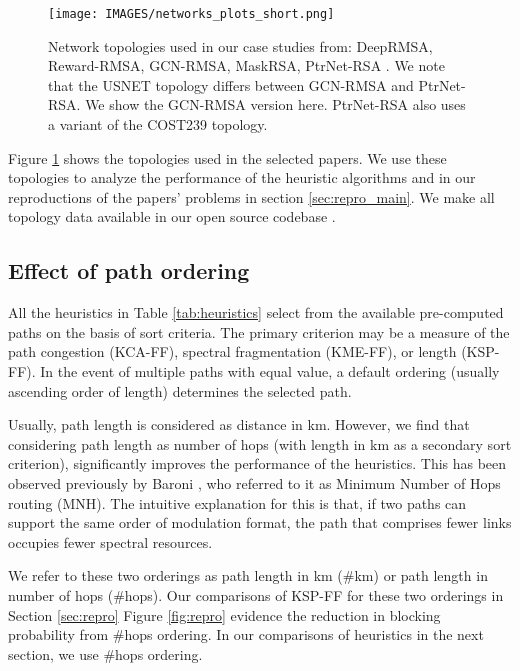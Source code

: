 \begin{figure}
  \texttt{[image: IMAGES/networks\_plots\_short.png]}
  \caption{Network topologies used in our case studies from: DeepRMSA, Reward-RMSA, GCN-RMSA, MaskRSA, PtrNet-RSA \cite{chen_deeprmsa_2019} \cite{tang_heuristic_2022} \cite{xu_deep_2022} \cite{shimoda_mask_2021} \cite{cheng_ptrnet-rsa_2024}. We note that the USNET topology differs between GCN-RMSA and PtrNet-RSA. We show the GCN-RMSA version here. PtrNet-RSA also uses a variant of the COST239 topology.} %
  \label{fig:network_plots}
\end{figure}

Figure \ref{fig:network_plots} shows the topologies used in the selected papers. We use these topologies to analyze the performance of the heuristic algorithms and in our reproductions of the papers' problems in section \ref{sec:repro_main}. %
We make all topology data available in our open source codebase \cite{michael_doherty_2024_jocn_xlron_2024}.



\subsection{Effect of path ordering}

All the heuristics in Table \ref{tab:heuristics} select from the available pre-computed paths on the basis of sort criteria. The primary criterion may be a measure of the path congestion (KCA-FF), spectral fragmentation (KME-FF), or length (KSP-FF). In the event of multiple paths with equal value, a default ordering (usually ascending order of length) determines the selected path.

Usually, path length is considered as distance in km. However, we find that considering path length as number of hops (with length in km as a secondary sort criterion), significantly improves the performance of the heuristics. This has been observed previously by Baroni \cite{baroni_routing_1998}, who referred to it as Minimum Number of Hops routing (MNH). The intuitive explanation for this is that, if two paths can support the same order of modulation format, the path that comprises fewer links occupies fewer spectral resources. 

We refer to these two orderings as path length in km (\#km) or path length in number of hops (\#hops). Our comparisons of KSP-FF for these two orderings in Section \ref{sec:repro} Figure \ref{fig:repro} evidence the reduction in blocking probability from \#hops ordering. In our comparisons of heuristics in the next section, we use \#hops ordering.



